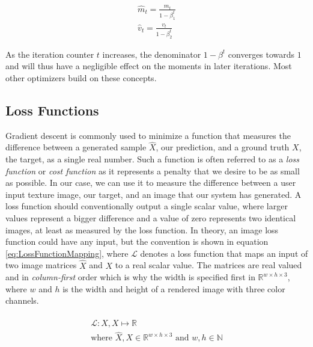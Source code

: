 \begin{equation}\label{eq:BiasCorrectedMoments}
    \begin{aligned}
    \hat{m}_t = \frac{m_t}{1- \beta_1^t} \\
    \hat{v}_t = \frac{v_t}{1 - \beta_2^t}
    \end{aligned}
\end{equation}

As the iteration counter $t$ increases, the denominator $1 - \beta^t$ converges towards $1$ and will thus have a negligible effect on the moments in later iterations. Most other optimizers build on these concepts.

\subsection{Loss Functions}\label{sec:LossFunctions}

Gradient descent is commonly used to minimize a function that measures the difference between a generated sample $\hat{X}$, our prediction, and a ground truth $X$, the target, as a single real number. Such a function is often referred to as a \textit{loss function} or \textit{cost function} as it represents a penalty that we desire to be as small as possible. In our case, we can use it to measure the difference between a user input texture image, our target, and an image that our system has generated. A loss function should conventionally output a single scalar value, where larger values represent a bigger difference and a value of zero represents two identical images, at least as measured by the loss function. In theory, an image loss function could have any input, but the convention is shown in equation \ref{eq:LossFunctionMapping}, where $\mathcal{L}$ denotes a loss function that maps an input of two image matrices $\hat{X}$ and $X$ to a real scalar value. The matrices are real valued and in \textit{column-first} order which is why the width is specified first in $\mathbb{R}^{w \times h \times 3}$, where $w$ and $h$ is the width and height of a rendered image with three color channels.

\begin{equation}
    \begin{aligned}
    \mathcal{L}: \hat{X},X \mapsto \mathbb{R} \\
    \text{where } \hat{X}, X \in \mathbb{R}^{w\times h \times 3} \text{ and } w, h \in \mathbb{N}
    \end{aligned}
    \label{eq:LossFunctionMapping}
\end{equation}

